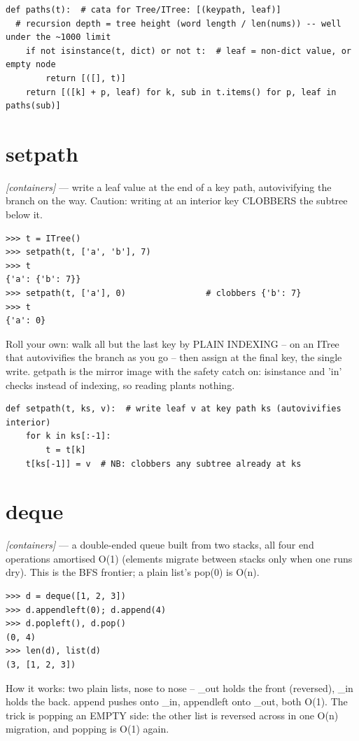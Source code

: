 \documentclass[11pt,letterpaper]{book}
\begin{document}
\begin{lstlisting}[style=code]
def paths(t):  # cata for Tree/ITree: [(keypath, leaf)]
  # recursion depth = tree height (word length / len(nums)) -- well under the ~1000 limit
    if not isinstance(t, dict) or not t:  # leaf = non-dict value, or empty node
        return [([], t)]
    return [([k] + p, leaf) for k, sub in t.items() for p, leaf in paths(sub)]
\end{lstlisting}

\section{setpath}
\noindent\textit{[containers]} --- write a leaf value at the end of a key path, autovivifying the branch on the way. Caution: writing at an interior key CLOBBERS the subtree below it.
\begin{lstlisting}[style=spec]
>>> t = ITree()
>>> setpath(t, ['a', 'b'], 7)
>>> t
{'a': {'b': 7}}
>>> setpath(t, ['a'], 0)                # clobbers {'b': 7}
>>> t
{'a': 0}
\end{lstlisting}

Roll your own: walk all but the last key by PLAIN INDEXING -- on an ITree that autovivifies the branch as you go -- then assign at the final key, the single write. getpath is the mirror image with the safety catch on: isinstance and 'in' checks instead of indexing, so reading plants nothing.

\begin{lstlisting}[style=code]
def setpath(t, ks, v):  # write leaf v at key path ks (autovivifies interior)
    for k in ks[:-1]:
        t = t[k]
    t[ks[-1]] = v  # NB: clobbers any subtree already at ks
\end{lstlisting}

\section{deque}
\noindent\textit{[containers]} --- a double-ended queue built from two stacks, all four end operations amortised O(1) (elements migrate between stacks only when one runs dry). This is the BFS frontier; a plain list's pop(0) is O(n).
\begin{lstlisting}[style=spec]
>>> d = deque([1, 2, 3])
>>> d.appendleft(0); d.append(4)
>>> d.popleft(), d.pop()
(0, 4)
>>> len(d), list(d)
(3, [1, 2, 3])
\end{lstlisting}

How it works: two plain lists, nose to nose -- \_out holds the front (reversed), \_in holds the back. append pushes onto \_in, appendleft onto \_out, both O(1). The trick is popping an EMPTY side: the other list is reversed across in one O(n) migration, and popping is O(1) again.
\end{document}
